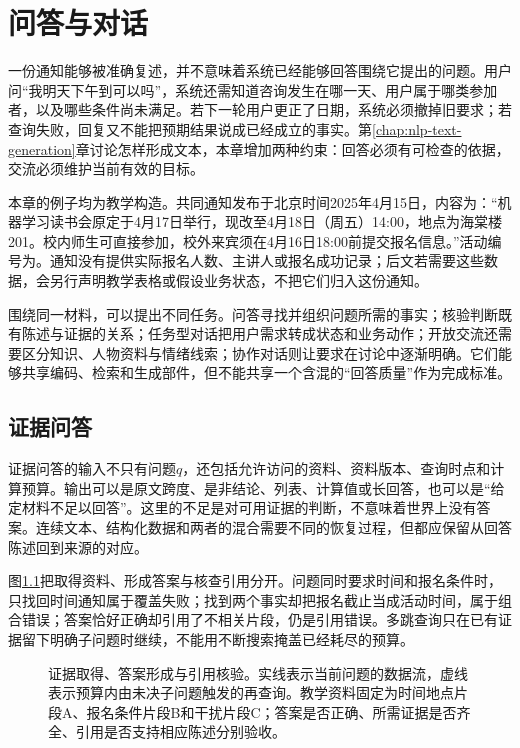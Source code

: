 \chapter{问答与对话}
\label{chap:nlp-question-answering-dialogue}

一份通知能够被准确复述，并不意味着系统已经能够回答围绕它提出的问题。用户问“我明天下午到可以吗”，系统还需知道咨询发生在哪一天、用户属于哪类参加者，以及哪些条件尚未满足。若下一轮用户更正了日期，系统必须撤掉旧要求；若查询失败，回复又不能把预期结果说成已经成立的事实。第\ref{chap:nlp-text-generation}章讨论怎样形成文本，本章增加两种约束：回答必须有可检查的依据，交流必须维护当前有效的目标。

本章的例子均为教学构造。共同通知发布于北京时间2025年4月15日，内容为：“机器学习读书会原定于4月17日举行，现改至4月18日（周五）14:00，地点为海棠楼201。校内师生可直接参加，校外来宾须在4月16日18:00前提交报名信息。”活动编号为。通知没有提供实际报名人数、主讲人或报名成功记录；后文若需要这些数据，会另行声明教学表格或假设业务状态，不把它们归入这份通知。

围绕同一材料，可以提出不同任务。问答寻找并组织问题所需的事实；核验判断既有陈述与证据的关系；任务型对话把用户需求转成状态和业务动作；开放交流还需要区分知识、人物资料与情绪线索；协作对话则让要求在讨论中逐渐明确。它们能够共享编码、检索和生成部件，但不能共享一个含混的“回答质量”作为完成标准。

\section{证据问答}
\label{sec:nlp-dialogue-evidence}

证据问答的输入不只有问题$q$，还包括允许访问的资料、资料版本、查询时点和计算预算。输出可以是原文跨度、是非结论、列表、计算值或长回答，也可以是“给定材料不足以回答”。这里的不足是对可用证据的判断，不意味着世界上没有答案。连续文本、结构化数据和两者的混合需要不同的恢复过程，但都应保留从回答陈述回到来源的对应。

图\ref{fig:nlp-dialogue-evidence}把取得资料、形成答案与核查引用分开。问题同时要求时间和报名条件时，只找回时间通知属于覆盖失败；找到两个事实却把报名截止当成活动时间，属于组合错误；答案恰好正确却引用了不相关片段，仍是引用错误。多跳查询只在已有证据留下明确子问题时继续，不能用不断搜索掩盖已经耗尽的预算。

\begin{figure}[htbp]
  \centering
  
  \caption{证据取得、答案形成与引用核验。实线表示当前问题的数据流，虚线表示预算内由未决子问题触发的再查询。教学资料固定为时间地点片段A、报名条件片段B和干扰片段C；答案是否正确、所需证据是否齐全、引用是否支持相应陈述分别验收。}
  \label{fig:nlp-dialogue-evidence}
\end{figure}

